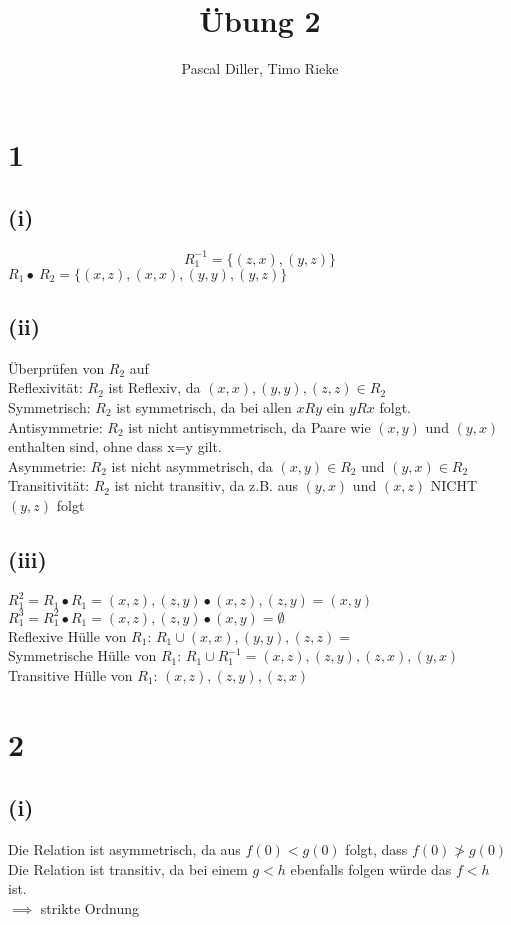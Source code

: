 \documentclass{article}
\title{Übung 2}
\author{Pascal Diller, Timo Rieke}
\begin{document}
\maketitle

\section{1}
\subsection{(i)}
\[R_1^{-1} = \{(z,x),(y,z)\}\]
$R_1 \bullet\ R_2 = \{(x,z),(x,x),(y,y),(y,z)\} $
\subsection{(ii)}
Überprüfen von $R_2$ auf \\
Reflexivität: 
$R_2$ ist Reflexiv, da $(x,x),(y,y),(z,z) \in R_2$ \\ 
Symmetrisch: 
$R_2$ ist symmetrisch, da bei allen $xRy$ ein $yRx$ folgt. \\
Antisymmetrie: 
$R_2$ ist nicht antisymmetrisch, da Paare wie $(x,y)$ und $(y,x)$ enthalten sind, ohne dass x=y gilt. \\
Asymmetrie: 
$R_2$ ist nicht asymmetrisch, da $(x,y) \in R_2$ und $(y,x) \in R_2$ \\ 
Transitivität:
$R_2$ ist nicht transitiv, da z.B. aus $(y,x)$ und $(x,z)$ NICHT $(y,z)$ folgt
\subsection{(iii)}
$R_1^{2} = R_1 \bullet R_1 = {(x,z),(z,y)} \bullet {(x,z),(z,y)} = {(x,y)}$ \\
$R_1^{3} = R_1^{2} \bullet R_1 = {(x,z),(z,y)} \bullet {(x,y)} = \emptyset$  \\
Reflexive Hülle von $R_1$: $R_1 \cup {(x,x),(y,y),(z,z)} =$ \\
Symmetrische Hülle von $R_1$: $R_1 \cup R_1^{-1} = {(x,z),(z,y),(z,x),(y,x)}$ \\
Transitive Hülle von $R_1$: ${(x,z),(z,y),(z,x)}$

\section{2}
\subsection{(i)}
Die Relation ist asymmetrisch, da aus $f(0) < g(0)$ folgt, dass $f(0) \ngtr g(0)$ \\
Die Relation ist transitiv, da bei einem $g<h$ ebenfalls folgen würde das $f<h$ ist. \\
$\implies$ strikte Ordnung
\end{document}
